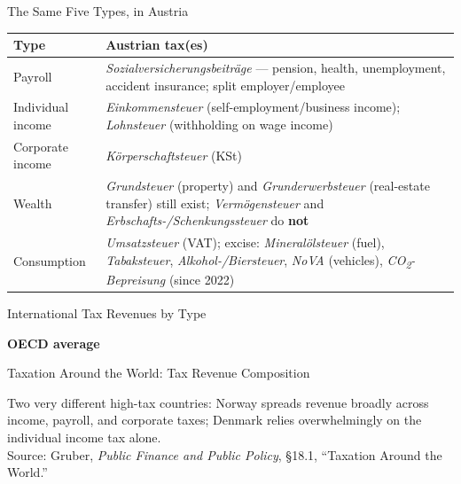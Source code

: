 \documentclass[11pt,aspectratio=169]{beamer}
\newcommand{\srcnote}[1]{{\footnotesize\color{wugray}Source: #1}}
\begin{document}
\begin{frame}{The Same Five Types, in Austria}
  \scriptsize
  \begin{center}
  \begin{tabular}{@{}p{2.6cm}p{9.3cm}@{}}
    \toprule
    \textbf{Type} & \textbf{Austrian tax(es)} \\
    \midrule
    Payroll & \emph{Sozialversicherungsbeiträge} --- pension, health, unemployment, accident insurance; split employer/employee \\[0.2em]
    Individual income & \emph{Einkommensteuer} (self-employment/business income); \emph{Lohnsteuer} (withholding on wage income) \\[0.2em]
    Corporate income & \emph{Körperschaftsteuer} (KSt) \\[0.2em]
    Wealth & \emph{Grundsteuer} (property) and \emph{Grunderwerbsteuer} (real-estate transfer) still exist; \emph{Vermögensteuer} and \emph{Erbschafts-/Schenkungssteuer} do \textbf{not} \\[0.2em]
    Consumption & \emph{Umsatzsteuer} (VAT); excise: \emph{Mineralölsteuer} (fuel), \emph{Tabaksteuer}, \emph{Alkohol-/Biersteuer}, \emph{NoVA} (vehicles), \emph{CO\textsubscript{2}-Bepreisung} (since 2022) \\
    \bottomrule
  \end{tabular}
  \end{center}
  \centering
   
\end{frame}

\begin{frame}{International Tax Revenues by Type}
\centering



		\textbf{OECD average}\\[0.2em]

\end{frame}

\begin{frame}{Taxation Around the World: Tax Revenue Composition}
  \begin{center}
  \end{center}
  \centering
  Two very different high-tax countries: Norway spreads revenue broadly across income, payroll, and corporate taxes; Denmark relies overwhelmingly on the individual income tax alone.\\
  \srcnote{Gruber, \emph{Public Finance and Public Policy}, \S18.1, ``Taxation Around the World.''}
\end{frame}
\end{document}
